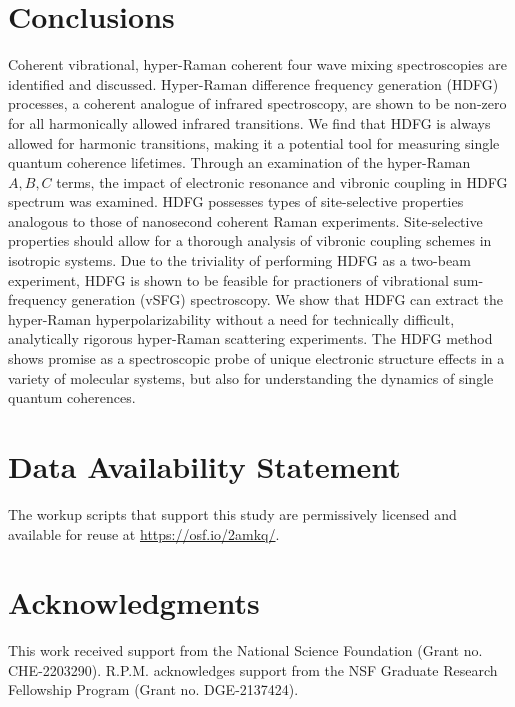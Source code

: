 \documentclass[aip, jcp, reprint, onecolumn]{revtex4-2}
\begin{document}
\section{Conclusions}\label{conclusion}
Coherent vibrational, hyper-Raman coherent four wave mixing spectroscopies are identified and discussed.
Hyper-Raman difference frequency generation (HDFG) processes, a coherent analogue of infrared spectroscopy, are shown to be non-zero for all harmonically allowed infrared transitions.
We find that HDFG is always allowed for harmonic transitions, making it a potential tool for measuring single quantum coherence lifetimes. 
Through an examination of the hyper-Raman $A,B,C$ terms, the impact of electronic resonance and vibronic coupling in HDFG spectrum was examined.
HDFG possesses types of site-selective properties analogous to those of nanosecond coherent Raman experiments. 
Site-selective properties should allow for a thorough analysis of vibronic coupling schemes in isotropic systems.
Due to the triviality of performing HDFG as a two-beam experiment, HDFG is shown to be feasible for practioners of vibrational sum-frequency generation (vSFG) spectroscopy. 
We show that HDFG can extract the hyper-Raman hyperpolarizability without a need for technically difficult, analytically rigorous hyper-Raman scattering experiments. 
The HDFG method shows promise as a spectroscopic probe of unique electronic structure effects in a variety of molecular systems, but also for understanding the dynamics of single quantum coherences. 

\section{Data Availability Statement}
The workup scripts that support this study are permissively licensed and available for reuse at \href{https://osf.io/2amkq/}{https://osf.io/2amkq/}.

\section{Acknowledgments}
This work received support from the National Science Foundation (Grant no. CHE-2203290).
R.P.M. acknowledges support from the NSF Graduate Research Fellowship Program (Grant no. DGE-2137424). 
\end{document}
